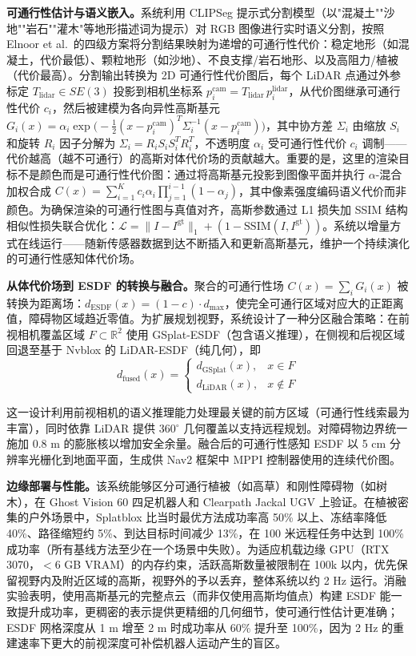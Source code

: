 \textbf{可通行性估计与语义嵌入。}系统利用 CLIPSeg 提示式分割模型（以"混凝土""沙地""岩石""灌木"等地形描述词为提示）对 RGB 图像进行实时语义分割，按照 Elnoor et al.\ 的四级方案将分割结果映射为递增的可通行性代价：稳定地形（如混凝土，代价最低）、颗粒地形（如沙地）、不良支撑/岩石地形、以及高阻力/植被（代价最高）。分割输出转换为 2D 可通行性代价图后，每个 LiDAR 点通过外参标定 $T_{\text{lidar}} \in SE(3)$ 投影到相机坐标系 $p_i^{\text{cam}} = T_{\text{lidar}} \, p_i^{\text{lidar}}$，从代价图继承可通行性代价 $c_i$，然后被建模为各向异性高斯基元 $G_i(x) = \alpha_i \exp\!\bigl(-\frac{1}{2}(x - p_i^{\text{cam}})^T \Sigma_i^{-1}(x - p_i^{\text{cam}})\bigr)$，其中协方差 $\Sigma_i$ 由缩放 $S_i$ 和旋转 $R_i$ 因子分解为 $\Sigma_i = R_i S_i S_i^T R_i^T$，不透明度 $\alpha_i$ 受可通行性代价 $c_i$ 调制——代价越高（越不可通行）的高斯对体代价场的贡献越大。重要的是，这里的渲染目标不是颜色而是可通行性代价图：通过将高斯基元投影到图像平面并执行 $\alpha$-混合 加权合成 $C(x) = \sum_{i=1}^K c_i \alpha_i \prod_{j=1}^{i-1}(1 - \alpha_j)$，其中像素强度编码语义代价而非颜色。为确保渲染的可通行性图与真值对齐，高斯参数通过 L1 损失加 SSIM 结构相似性损失联合优化：$\mathcal{L} = \|I - I^{\text{gt}}\|_1 + (1 - \text{SSIM}(I, I^{\text{gt}}))$。系统以增量方式在线运行——随新传感器数据到达不断插入和更新高斯基元，维护一个持续演化的可通行性感知体代价场。

\textbf{从体代价场到 ESDF 的转换与融合。}聚合的可通行性场 $C(x) = \sum_i G_i(x)$ 被转换为距离场：$d_{\text{ESDF}}(x) = (1 - c) \cdot d_{\max}$，使完全可通行区域对应大的正距离值，障碍物区域趋近零值。为扩展规划视野，系统设计了一种分区融合策略：在前视相机覆盖区域 $F \subset \mathbb{R}^2$ 使用 GSplat-ESDF（包含语义推理），在侧视和后视区域回退至基于 Nvblox 的 LiDAR-ESDF（纯几何），即
\begin{equation}
    d_{\text{fused}}(x) = \begin{cases} d_{\text{GSplat}}(x), & x \in F \\ d_{\text{LiDAR}}(x), & x \notin F \end{cases}
\end{equation}

这一设计利用前视相机的语义推理能力处理最关键的前方区域（可通行性线索最为丰富），同时依靠 LiDAR 提供 360$^\circ$ 几何覆盖以支持远程规划。对障碍物边界统一施加 0.8 m 的膨胀核以增加安全余量。融合后的可通行性感知 ESDF 以 5 cm 分辨率光栅化到地面平面，生成供 Nav2 框架中 MPPI 控制器使用的连续代价图。

\textbf{边缘部署与性能。}该系统能够区分可通行植被（如高草）和刚性障碍物（如树木），在 Ghost Vision 60 四足机器人和 Clearpath Jackal UGV 上验证。在植被密集的户外场景中，Splatblox 比当时最优方法成功率高 50\% 以上、冻结率降低 40\%、路径缩短约 5\%、到达目标时间减少 13\%，在 100 米远程任务中达到 100\% 成功率（所有基线方法至少在一个场景中失败）。为适应机载边缘 GPU（RTX 3070，$<$6 GB VRAM）的内存约束，活跃高斯数量被限制在 100k 以内，优先保留视野内及附近区域的高斯，视野外的予以丢弃，整体系统以约 2 Hz 运行。消融实验表明，使用高斯基元的完整点云（而非仅使用高斯均值点）构建 ESDF 能一致提升成功率，更稠密的表示提供更精细的几何细节，使可通行性估计更准确；ESDF 网格深度从 1 m 增至 2 m 时成功率从 60\% 提升至 100\%，因为 2 Hz 的重建速率下更大的前视深度可补偿机器人运动产生的盲区。

